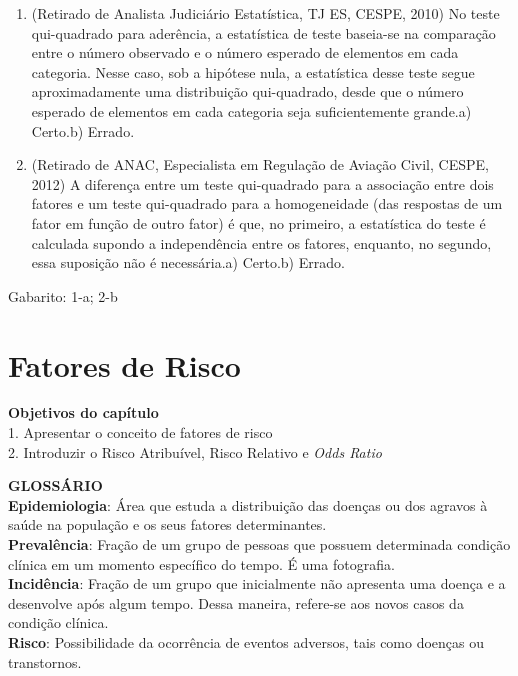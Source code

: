 \documentclass[
]{book}
\newenvironment{objectives}{
  \definecolor{shadecolor}{rgb}{0.764,0.992,0.686}  %
  \color{black}
  \begin{shaded}}
 {\end{shaded}}
\begin{document}
\begin{enumerate}
\def\labelenumi{\arabic{enumi}.}
\item
  (Retirado de Analista Judiciário Estatística, TJ ES, CESPE, 2010) No teste qui-quadrado para aderência, a estatística de teste baseia-se na comparação entre o número observado e o número esperado de elementos em cada categoria. Nesse caso, sob a hipótese nula, a estatística desse teste segue aproximadamente uma distribuição qui-quadrado, desde que o número esperado de elementos em cada categoria seja suficientemente grande.a) Certo.b) Errado.
\item
  (Retirado de ANAC, Especialista em Regulação de Aviação Civil, CESPE, 2012) A diferença entre um teste qui-quadrado para a associação entre dois fatores e um teste qui-quadrado para a homogeneidade (das respostas de um fator em função de outro fator) é que, no primeiro, a estatística do teste é calculada supondo a independência entre os fatores, enquanto, no segundo, essa suposição não é necessária.a) Certo.b) Errado.
\end{enumerate}

Gabarito: 1-a; 2-b

\hypertarget{fatores-de-risco}{%
\chapter{Fatores de Risco}\label{fatores-de-risco}}

\begin{objectives}
\textbf{Objetivos do capítulo}\\
1. Apresentar o conceito de fatores de risco\\
2. Introduzir o Risco Atribuível, Risco Relativo e \emph{Odds Ratio}

\end{objectives}

\textbf{GLOSSÁRIO}\\
\textbf{Epidemiologia}: Área que estuda a distribuição das doenças ou dos agravos à saúde na população e os seus fatores determinantes.\\
\textbf{Prevalência}: Fração de um grupo de pessoas que possuem determinada condição clínica em um momento específico do tempo. É uma fotografia.\\
\textbf{Incidência}: Fração de um grupo que inicialmente não apresenta uma doença e a desenvolve após algum tempo. Dessa maneira, refere-se aos novos casos da condição clínica.\\
\textbf{Risco}: Possibilidade da ocorrência de eventos adversos, tais como doenças ou transtornos.
\end{document}

